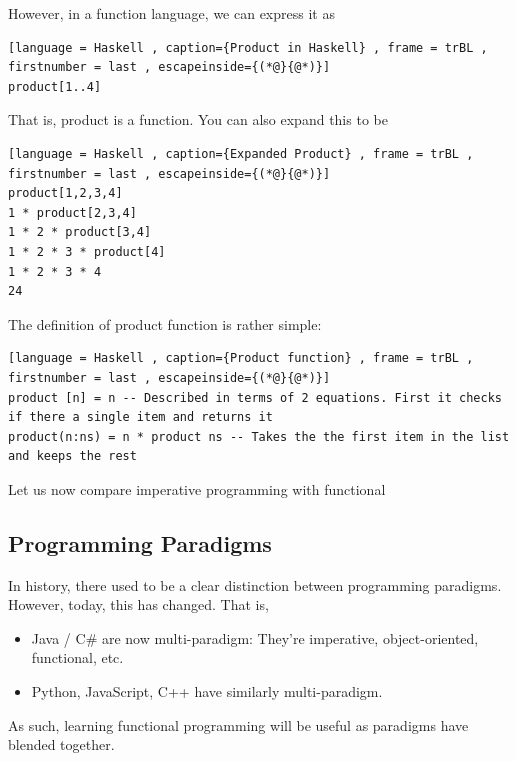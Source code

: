\documentclass[a4paper]{article}
\theoremstyle{plain}
\theoremstyle{definition}
\theoremstyle{remark}
\begin{document}
However, in a function language, we can express it as

\begin{lstlisting}[language = Haskell , caption={Product in Haskell} , frame = trBL , firstnumber = last , escapeinside={(*@}{@*)}]
product[1..4]
\end{lstlisting}
That is, product is a function. You can also expand this to be
\begin{lstlisting}[language = Haskell , caption={Expanded Product} , frame = trBL , firstnumber = last , escapeinside={(*@}{@*)}]
product[1,2,3,4] 
1 * product[2,3,4]
1 * 2 * product[3,4]
1 * 2 * 3 * product[4]
1 * 2 * 3 * 4
24
\end{lstlisting}
The definition of product function is rather simple:
\begin{lstlisting}[language = Haskell , caption={Product function} , frame = trBL , firstnumber = last , escapeinside={(*@}{@*)}]
product [n] = n -- Described in terms of 2 equations. First it checks if there a single item and returns it
product(n:ns) = n * product ns -- Takes the the first item in the list and keeps the rest
\end{lstlisting}
Let us now compare imperative programming with functional \\
\begin{flushleft}
\end{flushleft}
\subsection{Programming Paradigms}
In history, there used to be a clear distinction between programming paradigms. However, today, this has changed. That is,
\begin{itemize}
	\item Java / C# are now multi-paradigm: They're imperative, object-oriented, functional, etc.
	\item Python, JavaScript, C++ have similarly multi-paradigm.
\end{itemize}
As such, learning functional programming will be useful as paradigms have blended together.
\end{document}
